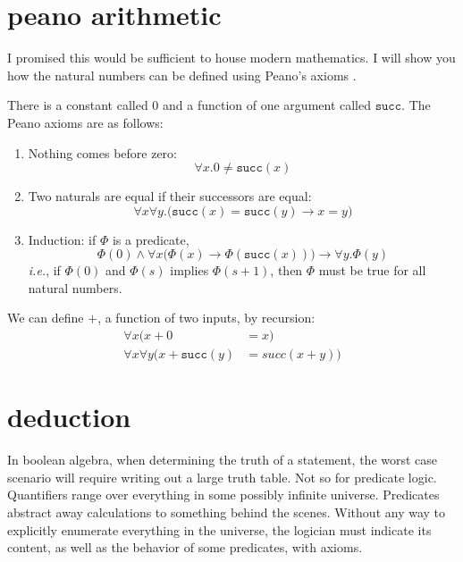 \documentclass{scrbook}
\renewcommand{\implies}{\to}
\newcommand{\ie}{\emph{i.e.}\xspace}
\begin{document}
\section[Peano Arithmetic]{peano arithmetic}
I promised this would be sufficient to house modern mathematics. I will show you how the natural numbers can be defined using Peano's axioms \cite{wiki:peano}. 

\renewcommand{\succ}{\texttt{succ}}
\begin{defn}
  There is a constant called $0$ and a function of one argument called
  $\succ$.  The Peano axioms are as follows:
  \begin{enumerate}
  \item Nothing comes before zero:
    \[
    \label{peano:0}
    \forall x. 0 \neq \succ(x)
    \]
  \item Two naturals are equal if their successors are equal:
    \[
    \label{peano:succ}
    \forall x\forall y.\bigl( \succ (x) = \succ(y) \implies x=y\bigr)
    \]
  \item Induction: if $\Phi$ is a predicate,
    \[
    \label{peano:ind}
    \Phi(0) \wedge \forall x \bigl(\Phi(x)\implies
    \Phi(\succ(x))\bigr) \implies \forall y.\Phi(y)
    \]
    \ie, if $\Phi(0)$ and $\Phi(s)$ implies $\Phi(s+1)$, then
    $\Phi$ must be true for all natural numbers.
  \end{enumerate}
\end{defn}

\begin{defn}[plus]
  \label{defn:peano:+}
  We can define $+$, a function of two inputs, by recursion:
  \begin{align*}
    \forall x (x + 0 &= x) \\
    \forall x \forall y \bigl(x + \succ(y) &= succ(x+y)\bigr)
  \end{align*}
\end{defn}
\section[Deduction]{deduction}
In boolean algebra, when determining the truth of a statement, the worst case scenario will require writing out a large truth table. Not so for predicate logic. Quantifiers range over everything in some possibly infinite universe. Predicates abstract away calculations to something behind the scenes. Without any way to explicitly enumerate everything in the universe, the logician must indicate its content, as well as the behavior of some predicates, with axioms.  
\end{document}
